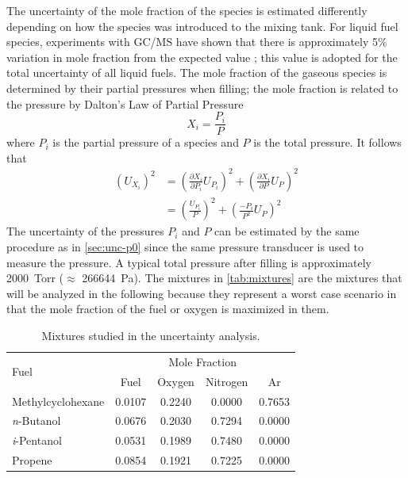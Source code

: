 \documentclass[12pt, letterpaper]{article}
\begin{document}
The uncertainty of the mole fraction of the species is estimated differently
depending on how the species was introduced to the mixing tank. For liquid fuel
species, experiments with GC/MS have shown that there is approximately 5\%
variation in mole fraction from the expected value \cite{Weber2011}; this value is adopted for
the total uncertainty of all liquid fuels. The mole fraction of the gaseous species
is determined by their partial pressures when filling; the mole fraction is
related to the pressure by Dalton's Law of Partial Pressure
\cite{Dalton1801,Gillespie1930}
%
\begin{equation}
X_i = \frac{P_i}{P}
\end{equation}
%
where $P_i$ is the partial pressure of a species and $P$ is the total pressure.
It follows that
%
\begin{equation}
\begin{split}
\left(U_{X_i}\right)^2 &= \left(\frac{\partial X_i}{\partial P_i} U_{P_i}\right)^2 + \left(\frac{\partial X_i}{\partial P} U_P\right)^2 \\
&= \left(\frac{U_{P_i}}{P}\right)^2 + \left(\frac{{-P_i}}{P^2} U_P\right)^2
\end{split}
\end{equation}
%
The uncertainty of the pressures $P_i$ and $P$ can be estimated by
the same procedure as in \autoref{sec:unc-p0} since the same pressure transducer
is used to measure the pressure. A typical total pressure after filling is
approximately \SI{2000}{Torr} ($\approx$ \SI{266644}{Pa}). The mixtures in
\autoref{tab:mixtures} are the mixtures that will be analyzed in the
following because they represent a worst case scenario in that the mole
fraction of the fuel or oxygen is maximized in them.

\begin{table}
\centering
\caption{Mixtures studied in the uncertainty analysis.}
\label{tab:mixtures}
\begin{tabular}{l *{4}{c}}
    \toprule
    \multirow{2}[0]{*}{Fuel} & \multicolumn{4}{c}{Mole Fraction} \\
         & Fuel & Oxygen & Nitrogen & Ar \\
    \midrule
    Methylcyclohexane   & 0.0107 & 0.2240 & 0.0000 & 0.7653 \\
    \textit{n}-Butanol  & 0.0676 & 0.2030 & 0.7294 & 0.0000 \\
    \textit{i}-Pentanol & 0.0531 & 0.1989 & 0.7480 & 0.0000 \\
    Propene             & 0.0854 & 0.1921 & 0.7225 & 0.0000 \\
    \bottomrule
    \end{tabular}
\end{table}
\end{document}
